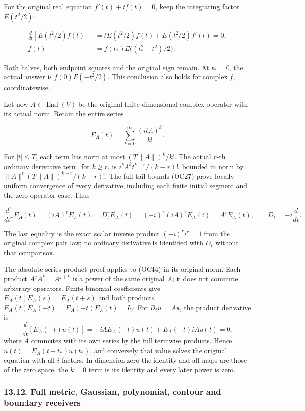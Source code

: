\documentclass[
  11pt,
]{article}
\begin{document}
For the original real equation \(f'(t)+t f(t)=0\), keep the integrating
factor \(E(t^2/2)\):

\[
 \begin{aligned}
 \frac d{dt}[E(t^2/2)f(t)]
 &=t E(t^2/2)f(t)+E(t^2/2)f'(t)=0,\\
 f(t)&=f(t_*)E\bigl((t_*^2-t^2)/2\bigr).
 \end{aligned}\tag{OC43}
\]

Both halves, both endpoint squares and the original sign remain. At
\(t_*=0\), the actual answer is \(f(0)E(-t^2/2)\). This conclusion also
holds for complex \(f\), coordinatewise.

Let now \(A\in\operatorname{End}(V)\) be the original finite-dimensional
complex operator with its actual norm. Retain the entire series

\[
 E_A(t)=\sum_{k=0}^\infty\frac{(itA)^k}{k!}.
\tag{OC44}
\]

For \(|t|\le T\), each term has norm at most \((T\|A\|)^k/k!\). The
actual \(r\)-th ordinary derivative term, for \(k\ge r\), is
\(i^k A^k t^{k-r}/(k-r)!\), bounded in norm by
\(\|A\|^r(T\|A\|)^{k-r}/(k-r)!\). The full tail bounds (OC27) prove
locally uniform convergence of every derivative, including each finite
initial segment and the zero-operator case. Thus

\[
 \frac{d^r}{dt^r}E_A(t)=(iA)^rE_A(t),\quad
 D_t^rE_A(t)=(-i)^r(iA)^rE_A(t)=A^rE_A(t),
 \qquad D_t=-i\frac d{dt}.
\tag{OC45}
\]

The last equality is the exact scalar inverse product \((-i)^ri^r=1\)
from the original complex pair law; no ordinary derivative is identified
with \(D_t\) without that comparison.

The absolute-series product proof applies to (OC44) in its original
norm. Each product \(A^jA^k=A^{j+k}\) is a power of the same original
\(A\); it does not commute arbitrary operators. Finite binomial
coefficients give \(E_A(t)E_A(s)=E_A(t+s)\) and both products
\(E_A(t)E_A(-t)=E_A(-t)E_A(t)=I_V\). For \(D_tu=Au\), the product
derivative is \[
 \frac d{dt}[E_A(-t)u(t)]
 =-iA E_A(-t)u(t)+E_A(-t)iA u(t)=0,
\tag{OC46}
\] where \(A\) commutes with its own series by the full termwise
products. Hence \(u(t)=E_A(t-t_*)u(t_*)\), and conversely that value
solves the original equation with all \(i\) factors. In dimension zero
the identity and all maps are those of the zero space, the \(k=0\) term
is its identity and every later power is zero.

\subsubsection{13.12. Full metric, Gaussian, polynomial, contour and
boundary
receivers}\label{full-metric-gaussian-polynomial-contour-and-boundary-receivers}
\end{document}

